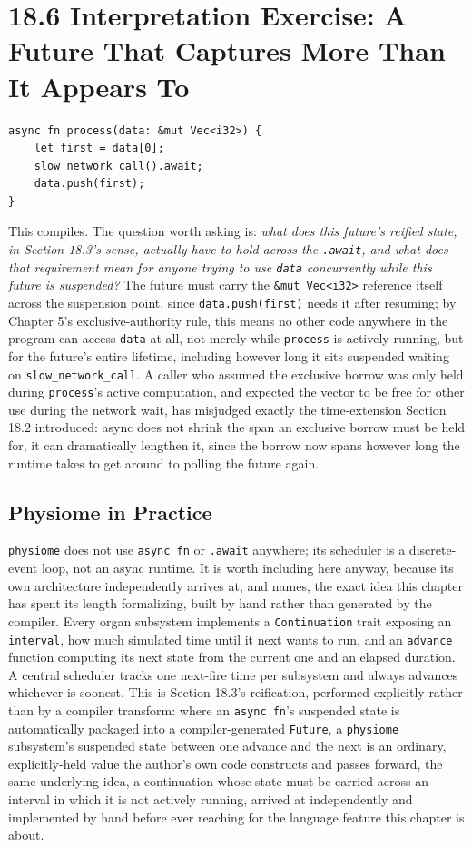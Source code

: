 \documentclass[11pt]{book}
\begin{document}
\section*{18.6 Interpretation Exercise: A Future That Captures More Than It Appears To}

\begin{lstlisting}
async fn process(data: &mut Vec<i32>) {
    let first = data[0];
    slow_network_call().await;
    data.push(first);
}
\end{lstlisting}

This compiles. The question worth asking is: \emph{what does this future's reified state, in Section 18.3's sense, actually have to hold across the \texttt{.await}, and what does that requirement mean for anyone trying to use \texttt{data} concurrently while this future is suspended?} The future must carry the \texttt{\&mut Vec<i32>} reference itself across the suspension point, since \texttt{data.push(first)} needs it after resuming; by Chapter 5's exclusive-authority rule, this means no other code anywhere in the program can access \texttt{data} at all, not merely while \texttt{process} is actively running, but for the future's entire lifetime, including however long it sits suspended waiting on \texttt{slow\_network\_call}. A caller who assumed the exclusive borrow was only held during \texttt{process}'s active computation, and expected the vector to be free for other use during the network wait, has misjudged exactly the time-extension Section 18.2 introduced: async does not shrink the span an exclusive borrow must be held for, it can dramatically lengthen it, since the borrow now spans however long the runtime takes to get around to polling the future again.

\subsection*{Physiome in Practice}

\texttt{physiome} does not use \texttt{async fn} or \texttt{.await} anywhere; its scheduler is a discrete-event loop, not an async runtime. It is worth including here anyway, because its own architecture independently arrives at, and names, the exact idea this chapter has spent its length formalizing, built by hand rather than generated by the compiler. Every organ subsystem implements a \texttt{Continuation} trait exposing an \texttt{interval}, how much simulated time until it next wants to run, and an \texttt{advance} function computing its next state from the current one and an elapsed duration. A central scheduler tracks one next-fire time per subsystem and always advances whichever is soonest. This is Section 18.3's reification, performed explicitly rather than by a compiler transform: where an \texttt{async fn}'s suspended state is automatically packaged into a compiler-generated \texttt{Future}, a \texttt{physiome} subsystem's suspended state between one advance and the next is an ordinary, explicitly-held value the author's own code constructs and passes forward, the same underlying idea, a continuation whose state must be carried across an interval in which it is not actively running, arrived at independently and implemented by hand before ever reaching for the language feature this chapter is about.
\end{document}
